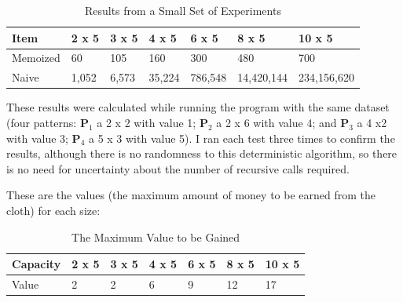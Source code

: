 \documentclass[paper=a4, fontsize=11pt]{scrartcl} %
\numberwithin{equation}{section} %
\numberwithin{figure}{section} %
\numberwithin{table}{section} %
\begin{document}
\begin{table}[h]
\caption{Results from a Small Set of Experiments}
\centering
    \begin{tabular}{|l|l|l|l|l|l|l|}
        \hline
        Item    & 2 x 5 & 3 x 5 & 4 x 5 & 6 x 5  & 8 x 5    & 10 x 5    \\ \hline
        Memoized & 60    & 105   & 160   & 300    & 480      & 700       \\ 
        Naive    & 1,052  & 6,573  & 35,224 & 786,548 & 14,420,144 & 234,156,620 \\
        \hline									
    \end{tabular}
\end{table}

These results were calculated while running the program with the same dataset (four patterns: $\mathbf{P}_1$ a 2 x 2 with value 1; $\mathbf{P}_2$ a 2 x 6 with value 4; and $\mathbf{P}_3$ a 4 x2 with value 3; $\mathbf{P}_4$ a 5 x 3 with value 5). I ran each test three times to confirm the results, although there is no randomness to this deterministic algorithm, so there is no need for uncertainty about the number of recursive calls required.

These are the values (the maximum amount of money to be earned from the cloth) for each size: 
\begin{table}[h]
\caption{The Maximum Value to be Gained }
\centering
    \begin{tabular}{|l|l|l|l|l|l|l|}
        \hline
        Capacity & 2 x 5 & 3 x 5 & 4 x 5 & 6 x 5 & 8 x 5 & 10 x 5 \\ \hline
        Value    & 2     & 2     & 6     & 9     & 12    & 17     \\
        \hline
    \end{tabular}
\end{table}
\end{document}
